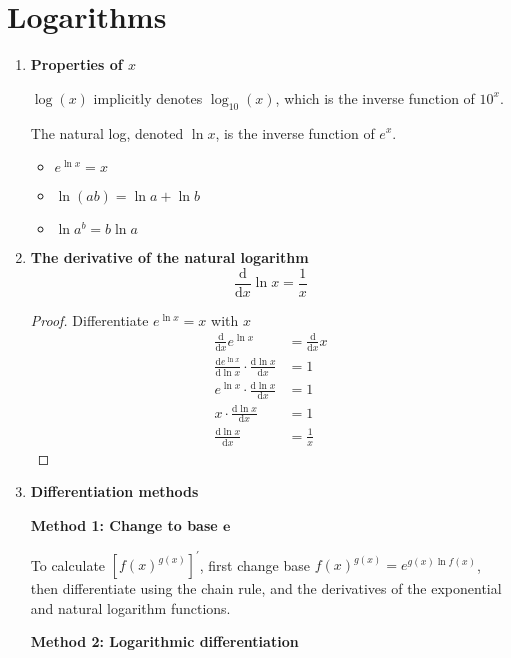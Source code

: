 \section{Logarithms}
\begin{enumerate}
    \item \textbf{Properties of $x$}

        $\log(x)$ implicitly denotes $\log_{10}(x)$, which is the inverse function of $10^x$.

        The natural log, denoted $\ln x$, is the inverse function of $e^x$.
        \begin{itemize}
            \item $e^{\ln x}=x$
            \item $\ln(ab)=\ln a+\ln b$
            \item $\ln a^b=b\ln a$
        \end{itemize}
    \item \textbf{The derivative of the natural logarithm}
        $$
        \frac{\mathrm{d}}{\mathrm{d}x}\ln x=\frac{1}{x}
        $$
        \begin{proof}
            Differentiate $e^{\ln x}=x$ with $x$
            \begin{align*}
                \frac{\mathrm{d}}{\mathrm{d}x}e^{\ln x} & =\frac{\mathrm{d}}{\mathrm{d}x}x \\
                \frac{\mathrm{d}e^{\ln x}}{\mathrm{d}\ln x}\cdot\frac{\mathrm{d}\ln x}{\mathrm{d}x} & =1 \\
                e^{\ln x}\cdot\frac{\mathrm{d}\ln x}{\mathrm{d}x} & =1 \\
                x\cdot\frac{\mathrm{d}\ln x}{\mathrm{d}x} & =1 \\
                \frac{\mathrm{d}\ln x}{\mathrm{d}x} & =\frac{1}{x}
            \end{align*}
        \end{proof}
    \item \textbf{Differentiation methods}
        
        \textbf{Method 1: Change to base $\bm{e}$}

        To calculate $\left[f(x)^{g(x)}\right]^\prime$, first change base $f(x)^{g(x)}=e^{g(x)\ln f(x)}$, then differentiate using the chain rule, and the derivatives of the exponential and natural logarithm functions.

        \textbf{Method 2: Logarithmic differentiation}


\end{enumerate}
